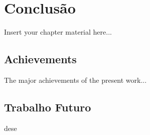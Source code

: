 
\chapter{Conclusão}
\label{chapter:conclusao}

Insert your chapter material here...


\section{Achievements}
\label{section:achievements}

The major achievements of the present work...


\section{Trabalho Futuro}
\label{section:futuro}

dese


\cleardoublepage

